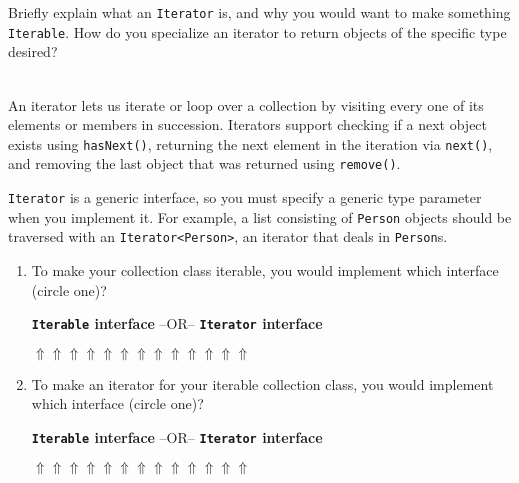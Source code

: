 Briefly explain what an \texttt{Iterator} is, and why you would want
to make something \texttt{Iterable}. How do you specialize an iterator to return objects of the specific type desired? \\ \\
\begin{answer}
An iterator lets us iterate or loop over a collection by visiting every one of its elements or members in succession.
Iterators support checking if a next object exists using \texttt{hasNext()}, returning the next element in the iteration via \texttt{next()}, and removing the last object that was returned using \texttt{remove()}.

\texttt{Iterator} is a generic interface, so you must specify a generic type parameter when you implement it.
For example, a list consisting of \texttt{Person} objects should be traversed with an \texttt{Iterator<Person>}, an iterator that deals in \texttt{Person}s.
\end{answer}
\begin{enumerate}
	\item To make your collection class iterable, you would implement which interface (circle one)?
	
	\textbf{\texttt{Iterable} interface} --OR-- \textbf{\texttt{Iterator} interface}\\
	\begin{answer}
	\textbf{$\Uparrow \Uparrow \Uparrow \Uparrow \Uparrow \Uparrow \Uparrow \Uparrow \Uparrow \Uparrow \Uparrow \Uparrow \Uparrow$}
	\end{answer}
	
	\item To make an iterator for your iterable collection class, you would implement which interface (circle one)?
	
	\textbf{\texttt{Iterable} interface} --OR-- \textbf{\texttt{Iterator} interface}\\
	\begin{answer}
	\hspace{1.85in}\textbf{$\Uparrow \Uparrow \Uparrow \Uparrow \Uparrow \Uparrow \Uparrow \Uparrow \Uparrow \Uparrow \Uparrow \Uparrow \Uparrow$}
	\end{answer}
\end{enumerate}